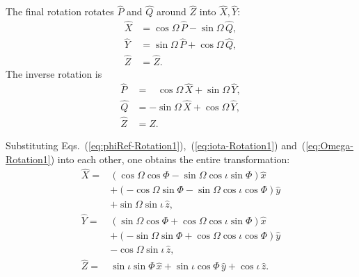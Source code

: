 \documentclass[11pt,tightenlines,article,amssymb,amsmath,amsfonts,superscriptaddress]{revtex4}
\newcommand{\ExS}{{{\hat x}}}
\newcommand{\EyS}{{{\hat y}}}
\newcommand{\EzS}{{{\hat z}}}
\newcommand{\ExW}{\hat X}
\newcommand{\EyW}{\hat Y}
\newcommand{\EzW}{\hat Z}
\newcommand{\phiRef}{\Phi} %
\begin{document}
The final rotation rotates $\hat P$ and $\hat Q$
around $\EzW$ into $\ExW,\EyW$:
\begin{subequations}
  \label{eq:Omega-Rotation1}
\begin{align}
  \ExW&=\cos\Omega\,\hat P-\sin\Omega\,\hat Q,\\
  \EyW&=\sin\Omega\,\hat P+\cos\Omega\,\hat Q,\\
  \EzW&=\EzW.
\end{align}
\end{subequations}
The inverse rotation is
\begin{subequations}
  \label{eq:Omega-Rotation2}
\begin{align}
  \hat P&=\;\;\;\cos\Omega\,\ExW+\sin\Omega\,\EyW,\\
  \hat Q&=-\sin\Omega\,\ExW+\cos\Omega\,\EyW,\\
  \EzW&=\EzW.
\end{align}
\end{subequations}

Substituting Eqs.~(\ref{eq:phiRef-Rotation1}),~(\ref{eq:iota-Rotation1}) and~(\ref{eq:Omega-Rotation1}) into each other, one obtains the entire transformation:
\begin{subequations}
  \label{eq:Source-To-Wave}
  \begin{align}
    \ExW=& \left(\cos\Omega\cos\phiRef-\sin\Omega\cos\iota\sin\phiRef\right)\ExS
    \nonumber \\
    & + \left(-\cos\Omega\sin\phiRef-\sin\Omega\cos\iota\cos\phiRef\right)\EyS
    \nonumber\\
    & + \sin\Omega\sin\iota\,\EzS,\\
\EyW=& \left(\sin\Omega\cos\phiRef+\cos\Omega\cos\iota\sin\phiRef\right)\ExS
    \nonumber \\
    & + \left(-\sin\Omega\sin\phiRef+\cos\Omega\cos\iota\cos\phiRef\right)\EyS
    \nonumber\\
    & - \cos\Omega\sin\iota\,\EzS,\\
\label{eq:Z_from_z}
\EzW=&\sin\iota\sin\phiRef\,\ExS+\sin\iota\cos\phiRef\,\EyS + \cos\iota\,\EzS.
  \end{align}
  \end{subequations}
\end{document}
